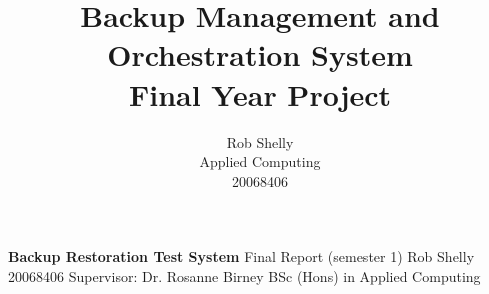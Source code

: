 \documentclass[]{article}
\title{Backup Management and Orchestration System\\
	Final Year Project}
\author{Rob Shelly\\
	Applied Computing\\
	20068406}
\begin{document}
\noindent \LARGE{\textbf{Backup Restoration Test System}}
\bigbreak
\noindent \large{Final Report (semester 1)}
\bigbreak
\noindent \Large{Rob Shelly}
\bigbreak
\noindent \Large{20068406}
\bigbreak
\noindent \Large{Supervisor: Dr. Rosanne Birney}
\bigbreak
\bigbreak
\noindent \Large{BSc (Hons) in Applied Computing}
\thispagestyle{empty}

\newpage
{}
\tableofcontents

\newpage
{}










\newpage
\renewcommand*{\bibfont}{\raggedright}


\end{document}
